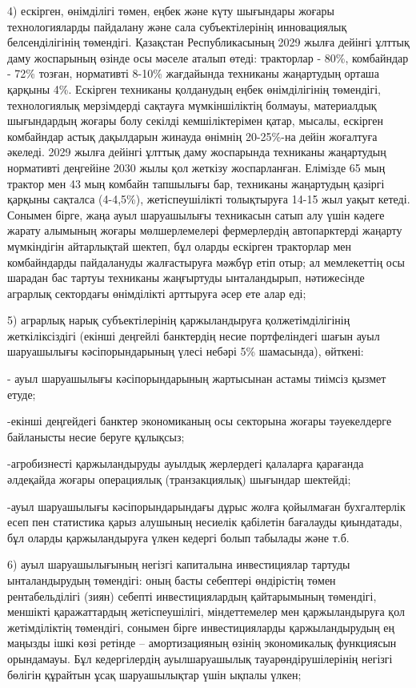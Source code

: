 \begin{multicols}{2}
4) ескірген, өнімділігі төмен, еңбек және күту шығындары жоғары
технологияларды пайдалану және сала субъектілерінің инновациялық
белсенділігінің төмендігі. Қазақстан Республикасының 2029 жылға дейінгі
ұлттық даму жоспарының өзінде осы мәселе аталып өтеді: тракторлар -
80\%, комбайндар - 72\% тозған, нормативті 8-10\% жағдайында техниканы
жаңартудың орташа қарқыны 4\%. Ескірген техниканы қолданудың еңбек
өнімділігінің төмендігі, технологиялық мерзімдерді сақтауға
мүмкіншіліктің болмауы, материалдық шығындардың жоғары болу секілді
кемшіліктерімен қатар, мысалы, ескірген комбайндар астық дақылдарын
жинауда өнімнің 20-25\%-на дейін жоғалтуға әкеледі. 2029 жылға дейінгі
ұлттық даму жоспарында техниканы жаңартудың нормативті деңгейіне 2030
жылы қол жеткізу жоспарланған. Елімізде 65 мың трактор мен 43 мың
комбайн тапшылығы бар, техниканы жаңартудың қазіргі қарқыны сақталса
(4-4,5\%), жетіспеушілікті толықтыруға 14-15 жыл уақыт кетеді. Сонымен
бірге, жаңа ауыл шаруашылығы техникасын сатып алу үшін кәдеге жарату
алымының жоғары мөлшерлемелері фермерлердің автопарктерді жаңарту
мүмкіндігін айтарлықтай шектеп, бұл оларды ескірген тракторлар мен
комбайндарды пайдалануды жалғастыруға мәжбүр етіп отыр; ал мемлекеттің
осы шарадан бас тартуы техниканы жаңғыртуды ынталандырып, нәтижесінде
аграрлық сектордағы өнімділікті арттыруға әсер ете алар еді;

5) аграрлық нарық субъектілерінің қаржыландыруға қолжетімділігінің
жеткіліксіздігі (екінші деңгейлі банктердің несие портфеліндегі шағын
ауыл шаруашылығы кәсіпорындарының үлесі небәрі 5\% шамасында), өйткені:

- ауыл шаруашылығы кәсіпорындарының жартысынан астамы тиімсіз қызмет
етуде;

-екінші деңгейдегі банктер экономиканың осы секторына жоғары
тәуекелдерге байланысты несие беруге құлықсыз;

-агробизнесті қаржыландыруды ауылдық жерлердегі қалаларға қарағанда
әлдеқайда жоғары операциялық (транзакциялық) шығындар шектейді;

-ауыл шаруашылығы кәсіпорындарындағы дұрыс жолға қойылмаған бухгалтерлік
есеп пен статистика қарыз алушының несиелік қабілетін бағалауды
қиындатады, бұл оларды қаржыландыруға үлкен кедергі болып табылады және
т.б.

6) ауыл шаруашылығының негізгі капиталына инвестициялар тартуды
ынталандырудың төмендігі: оның басты себептері өндірістің төмен
рентабельділігі (зиян) себепті инвестициялардың қайтарымының төмендігі,
меншікті қаражаттардың жетіспеушілігі, міндеттемелер мен қаржыландыруға
қол жетімділіктің төмендігі, сонымен бірге инвестицияларды
қаржыландырудың ең маңызды ішкі көзі ретінде -- амортизацияның өзінің
экономикалық функциясын орындамауы. Бұл кедергілердің ауылшаруашылық
тауарөндірушілерінің негізгі бөлігін құрайтын ұсақ шаруашылықтар үшін
ықпалы үлкен;


\end{multicols}
